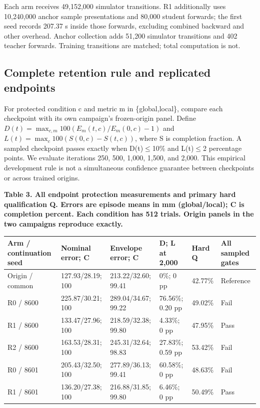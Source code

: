 \documentclass[letterpaper,10pt,conference]{ieeeconf}
\begin{document}
Each arm receives 49,152,000 simulator transitions. R1 additionally uses 10,240,000 anchor sample presentations and 80,000 student forwards; the first seed records 207.37 s inside those forwards, excluding combined backward and other overhead. Anchor collection adds 51,200 simulator transitions and 402 teacher forwards. Training transitions are matched; total computation is not.

\subsection{Complete retention rule and replicated endpoints}

For protected condition c and metric m in \{global,local\}, compare each checkpoint with its own campaign's frozen-origin panel. Define $D(t)=\max_{c,m}100(E_m(t,c)/E_m(0,c)-1)$ and $L(t)=\max_c100(S(0,c)-S(t,c))$, where S is completion fraction. A sampled checkpoint passes exactly when D(t)$\leq$10\% and L(t)$\leq$2 percentage points. We evaluate iterations 250, 500, 1,000, 1,500, and 2,000. This empirical development rule is not a simultaneous confidence guarantee between checkpoints or across trained origins.


\begin{table}[t]\small
\textbf{Table 3. All endpoint protection measurements and primary hard qualification Q. Errors are episode means in mm (global/local); C is completion percent. Each condition has 512 trials. Origin panels in the two campaigns reproduce exactly.}\par\medskip
\begin{tabularx}{\linewidth}{XXXXXX}\hline
Arm / continuation seed & Nominal error; C & Envelope error; C & D; L at 2,000 & Hard Q & All sampled gates \\\hline
Origin / common & 127.93/28.19; 100 & 213.22/32.60; 99.41 & 0\%; 0 pp & 42.77\% & Reference \\
R0 / 8600 & 225.87/30.21; 100 & 289.04/34.67; 99.22 & 76.56\%; 0.20 pp & 49.02\% & Fail \\
R1 / 8600 & 133.47/27.96; 100 & 218.59/32.38; 99.80 & 4.33\%; 0 pp & 47.95\% & Pass \\
R2 / 8600 & 163.53/28.31; 100 & 245.31/32.64; 98.83 & 27.83\%; 0.59 pp & 53.42\% & Fail \\
R0 / 8601 & 205.43/32.50; 100 & 277.89/36.13; 99.41 & 60.58\%; 0 pp & 48.63\% & Fail \\
R1 / 8601 & 136.20/27.38; 100 & 216.88/31.85; 99.80 & 6.46\%; 0 pp & 50.49\% & Pass \\
\hline\end{tabularx}\end{table}
\end{document}
